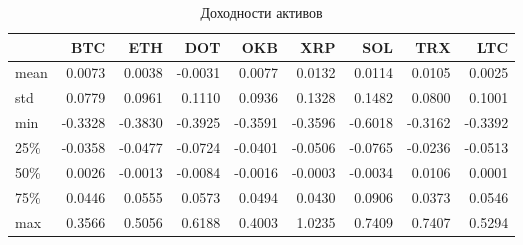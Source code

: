 \begin{table}[h]
\caption{Доходности активов}
\begin{tabular}{lrrrrrrrr}
\toprule
 & BTC & ETH & DOT & OKB & XRP & SOL & TRX & LTC \\
\midrule
mean & 0.0073 & 0.0038 & -0.0031 & 0.0077 & 0.0132 & 0.0114 & 0.0105 & 0.0025 \\
std & 0.0779 & 0.0961 & 0.1110 & 0.0936 & 0.1328 & 0.1482 & 0.0800 & 0.1001 \\
min & -0.3328 & -0.3830 & -0.3925 & -0.3591 & -0.3596 & -0.6018 & -0.3162 & -0.3392 \\
25\% & -0.0358 & -0.0477 & -0.0724 & -0.0401 & -0.0506 & -0.0765 & -0.0236 & -0.0513 \\
50\% & 0.0026 & -0.0013 & -0.0084 & -0.0016 & -0.0003 & -0.0034 & 0.0106 & 0.0001 \\
75\% & 0.0446 & 0.0555 & 0.0573 & 0.0494 & 0.0430 & 0.0906 & 0.0373 & 0.0546 \\
max & 0.3566 & 0.5056 & 0.6188 & 0.4003 & 1.0235 & 0.7409 & 0.7407 & 0.5294 \\
\bottomrule
\end{tabular}
\label{tab:returns_describe}
\end{table}
